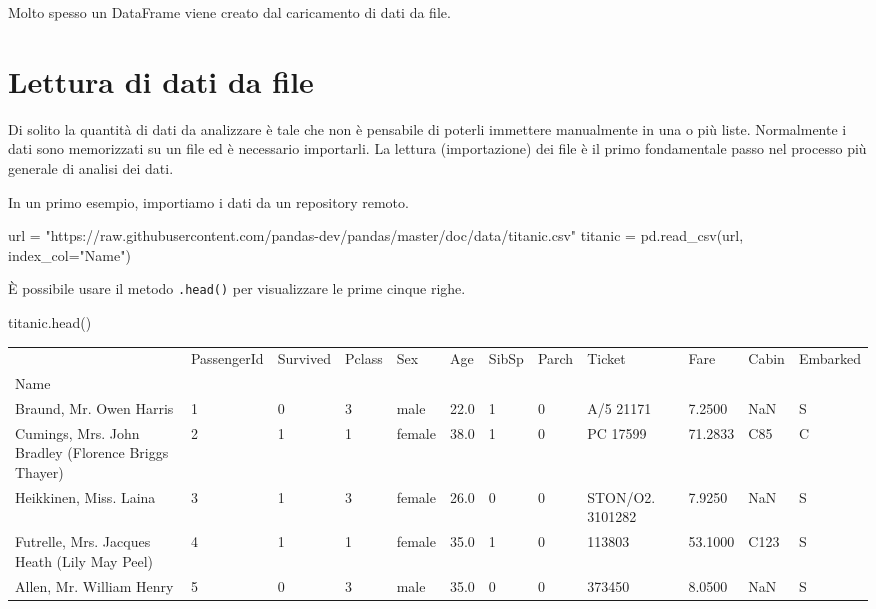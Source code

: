 \documentclass[
  letterpaper,
  krantz2]{{[}./krantz{]}}
\newenvironment{Shaded}{\begin{snugshade}}{\end{snugshade}}
\newcommand{\NormalTok}[1]{\textcolor[rgb]{0.00,0.23,0.31}{#1}}
\newcommand{\OperatorTok}[1]{\textcolor[rgb]{0.37,0.37,0.37}{#1}}
\newcommand{\StringTok}[1]{\textcolor[rgb]{0.13,0.47,0.30}{#1}}
\begin{document}
Molto spesso un DataFrame viene creato dal caricamento di dati da file.

\section{Lettura di dati da file}\label{lettura-di-dati-da-file}

Di solito la quantità di dati da analizzare è tale che non è pensabile
di poterli immettere manualmente in una o più liste. Normalmente i dati
sono memorizzati su un file ed è necessario importarli. La lettura
(importazione) dei file è il primo fondamentale passo nel processo più
generale di analisi dei dati.

In un primo esempio, importiamo i dati da un repository remoto.

\begin{Shaded}
\begin{Highlighting}[]
\NormalTok{url }\OperatorTok{=} \StringTok{"https://raw.githubusercontent.com/pandas{-}dev/pandas/master/doc/data/titanic.csv"}
\NormalTok{titanic }\OperatorTok{=}\NormalTok{ pd.read\_csv(url, index\_col}\OperatorTok{=}\StringTok{"Name"}\NormalTok{)}
\end{Highlighting}
\end{Shaded}

È possibile usare il metodo \texttt{.head()} per visualizzare le prime
cinque righe.

\begin{Shaded}
\begin{Highlighting}[]
\NormalTok{titanic.head()}
\end{Highlighting}
\end{Shaded}

\begin{longtable}[]{@{}llllllllllll@{}}
\toprule\noalign{}
& PassengerId & Survived & Pclass & Sex & Age & SibSp & Parch & Ticket &
Fare & Cabin & Embarked \\
Name & & & & & & & & & & & \\
\midrule\noalign{}
\endhead
\bottomrule\noalign{}
\endlastfoot
Braund, Mr. Owen Harris & 1 & 0 & 3 & male & 22.0 & 1 & 0 & A/5 21171 &
7.2500 & NaN & S \\
Cumings, Mrs. John Bradley (Florence Briggs Thayer) & 2 & 1 & 1 & female
& 38.0 & 1 & 0 & PC 17599 & 71.2833 & C85 & C \\
Heikkinen, Miss. Laina & 3 & 1 & 3 & female & 26.0 & 0 & 0 & STON/O2.
3101282 & 7.9250 & NaN & S \\
Futrelle, Mrs. Jacques Heath (Lily May Peel) & 4 & 1 & 1 & female & 35.0
& 1 & 0 & 113803 & 53.1000 & C123 & S \\
Allen, Mr. William Henry & 5 & 0 & 3 & male & 35.0 & 0 & 0 & 373450 &
8.0500 & NaN & S \\
\end{longtable}
\end{document}
